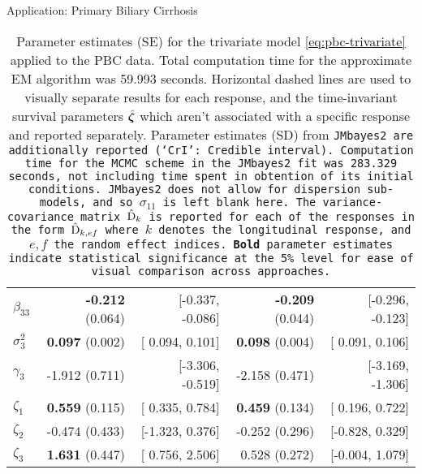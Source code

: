 \begin{chapter}{\label{cha:app-PBC}Application: Primary Biliary Cirrhosis}
\begin{table}[ht]
\begin{tabular}{lrrrr}
        $\beta_{33}$ & \textbf{-0.212} (0.064) & [-0.337, -0.086] & \textbf{-0.209} (0.044) & [-0.296, -0.123] \\ 
        $\sigma^2_3$ &  \textbf{0.097} (0.002) & [ 0.094,  0.101] & \textbf{ 0.098} (0.004) & [ 0.091,  0.106] \\ 
        $\gamma_3$ & -1.912 (0.711) & [-3.306, -0.519] & -2.158 (0.471) & [-3.169, -1.306] \\ 
        \hdashline
        $\zeta_1$ &  \textbf{0.559} (0.115) & [ 0.335, 0.784] &  \textbf{0.459} (0.134) & [ 0.196, 0.722] \\ 
        $\zeta_2$ & -0.474 (0.433) & [-1.323, 0.376] & -0.252 (0.296) & [-0.828, 0.329] \\ 
        $\zeta_3$ &  \textbf{1.631} (0.447) & [ 0.756, 2.506] &  0.528 (0.272) & [-0.004, 1.079] \\ 
    \hline
    \end{tabular}
    \endgroup
    \caption{Parameter estimates (SE) for the trivariate model \eqref{eq:pbc-trivariate} applied to the PBC data. Total computation time for the approximate EM algorithm was 59.993 seconds. Horizontal dashed lines are used to visually separate results for each response, and the time-invariant survival parameters $\hat{\bm{\zeta}}$ which aren't associated with a specific response and reported separately. Parameter estimates (SD) from \tt{JMbayes2} are additionally reported (`CrI': Credible interval). Computation time for the MCMC scheme in the \tt{JMbayes2} fit was 283.329 seconds, not including time spent in obtention of its initial conditions. \tt{JMbayes2} does not allow for dispersion sub-models, and so $\sigma_{11}$ is left blank here. The variance-covariance matrix $\hat{\mathrm{D}}_k$ is reported for each of the responses in the form $\hat{\mathrm{D}}_{k,ef}$ where $k$ denotes the longitudinal response, and $e,f$ the random effect indices. \textbf{Bold} parameter estimates indicate statistical significance at the 5\% level for ease of visual comparison across approaches.}
    \label{tab:pbc-trivmodel}
  \end{table}


\end{chapter}
